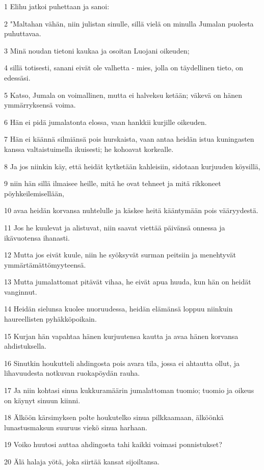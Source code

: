 \par 1 Elihu jatkoi puhettaan ja sanoi:
\par 2 "Maltahan vähän, niin julistan sinulle, sillä vielä on minulla Jumalan puolesta puhuttavaa.
\par 3 Minä noudan tietoni kaukaa ja osoitan Luojani oikeuden;
\par 4 sillä totisesti, sanani eivät ole valhetta - mies, jolla on täydellinen tieto, on edessäsi.
\par 5 Katso, Jumala on voimallinen, mutta ei halveksu ketään; väkevä on hänen ymmärryksensä voima.
\par 6 Hän ei pidä jumalatonta elossa, vaan hankkii kurjille oikeuden.
\par 7 Hän ei käännä silmiänsä pois hurskaista, vaan antaa heidän istua kuningasten kanssa valtaistuimella ikuisesti; he kohoavat korkealle.
\par 8 Ja jos niinkin käy, että heidät kytketään kahleisiin, sidotaan kurjuuden köysillä,
\par 9 niin hän sillä ilmaisee heille, mitä he ovat tehneet ja mitä rikkoneet pöyhkeilemisellään,
\par 10 avaa heidän korvansa nuhtelulle ja käskee heitä kääntymään pois vääryydestä.
\par 11 Jos he kuulevat ja alistuvat, niin saavat viettää päivänsä onnessa ja ikävuotensa ihanasti.
\par 12 Mutta jos eivät kuule, niin he syöksyvät surman peitsiin ja menehtyvät ymmärtämättömyyteensä.
\par 13 Mutta jumalattomat pitävät vihaa, he eivät apua huuda, kun hän on heidät vanginnut.
\par 14 Heidän sielunsa kuolee nuoruudessa, heidän elämänsä loppuu niinkuin haureellisten pyhäkköpoikain.
\par 15 Kurjan hän vapahtaa hänen kurjuutensa kautta ja avaa hänen korvansa ahdistuksella.
\par 16 Sinutkin houkutteli ahdingosta pois avara tila, jossa ei ahtautta ollut, ja lihavuudesta notkuvan ruokapöydän rauha.
\par 17 Ja niin kohtasi sinua kukkuramäärin jumalattoman tuomio; tuomio ja oikeus on käynyt sinuun kiinni.
\par 18 Älköön kärsimyksen polte houkutelko sinua pilkkaamaan, älköönkä lunastusmaksun suuruus viekö sinua harhaan.
\par 19 Voiko huutosi auttaa ahdingosta tahi kaikki voimasi ponnistukset?
\par 20 Älä halaja yötä, joka siirtää kansat sijoiltansa.

